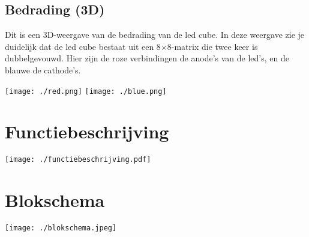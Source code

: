 \documentclass[12pt, a4paper, dutch]{article}
\begin{document}
\subsection{Bedrading (3D)}

Dit is een 3D-weergave van de bedrading van de led cube. In deze weergave zie je
duidelijk dat de led cube bestaat uit een 8$\times$8-matrix die twee keer is
dubbelgevouwd. Hier zijn de roze verbindingen de anode's van de led's, en de blauwe
de cathode's.

\begin{center}
\texttt{[image: ./red.png]}
\hspace{1cm}
\texttt{[image: ./blue.png]}
\end{center}

\section{Functiebeschrijving}

\texttt{[image: ./functiebeschrijving.pdf]}

\section{Blokschema}

\texttt{[image: ./blokschema.jpeg]}
\end{document}
